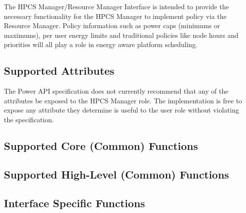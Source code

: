 The HPCS Manager/Resource Manager Interface is intended to provide the necessary functionality for the HPCS Manager to implement policy via the Resource Manager.
Policy information such as power caps (minimums or maximums), per user energy limits and traditional policies like node hours and priorities will all play a role in energy aware platform scheduling. 

\subsection{Supported Attributes}\label{sec:MgrRMAttributes}
The Power API specification does not currently recommend that any of the attributes be exposed to the HPCS Manager role. 
The implementation is free to expose any attribute they determine is useful to the user role without violating the specification.

\subsection{Supported Core (Common) Functions}\label{sec:MgrRMSupportedCommon}


\subsection{Supported High-Level (Common) Functions}\label{sec:MgrRMHighLevel}


\subsection{Interface Specific Functions}\label{sec:MgrRMFunctions}

